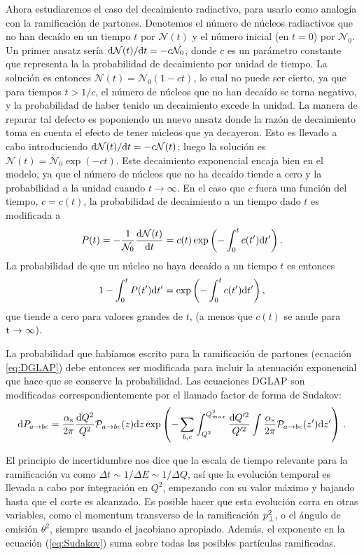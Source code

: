 Ahora estudiaremos el caso del decaimiento radiactivo, para usarlo como analogía con la ramificación de partones. Denotemos el número de núcleos radiactivos que no han decaído en un tiempo $t$ por $\mathcal N(t)$ y el número inicial (en $t=0$) por $\mathcal N_0$. Un primer ansatz sería ${\mathrm d}\mathcal N(t)/{\mathrm d} t = -c \mathcal N_0$, donde $c$ es un parámetro constante que representa la la probabilidad de decaimiento por unidad de tiempo. La solución es entonces $\mathcal N (t) = \mathcal N_0(1-ct)$, lo cual no puede ser cierto, ya que para tiempos $t>1/c$, el número de núcleos que no han decaído se torna negativo, y la probabilidad de haber tenido un decaimiento excede la unidad. La manera de reparar tal defecto es poponiendo un nuevo ansatz donde la razón de decaimiento toma en cuenta el efecto de tener núcleos que ya decayeron. Esto es llevado a cabo introduciendo ${\mathrm d}\mathcal N(t)/{\mathrm d} t = -c \mathcal N(t)$; luego la solución es $\mathcal N(t) = \mathcal N_0 \exp(-ct)$. Este decaimiento exponencial encaja bien en el modelo, ya que el número de núcleos que no ha decaído tiende a cero y la probabilidad a la unidad cuando $t\to \infty$. En el caso que $c$ fuera una función del tiempo, $c=c(t)$, la probabilidad de decaimiento a un tiempo dado $t$ es modificada a
$$P(t)=-\frac{1}{\mathcal N_0} \frac{{\mathrm d}\mathcal N (t)}{{\mathrm d} t} = c(t) \exp\left(-\int_0^t c(t') {\mathrm d} t'\right).$$
La probabilidad de que un núcleo no haya decaído a un tiempo $t$ es entonces
$$1- \int_0^t P(t'){\mathrm d} t' = \exp \left(-\int_0^t c(t'){\mathrm d} t' \right),$$
que tiende a cero para valores grandes de $t$, (a menos que $c(t)$ se anule para ${\mathrm t}\to\infty$).

La probabilidad que habíamos escrito para la ramificación de partones (ecuación \ref{eq:DGLAP}) debe entonces ser modificada para incluir la atenuación exponencial que hace que se conserve la probabilidad. Las ecuaciones DGLAP son modificadas correspondientemente por el llamado factor de forma de Sudakov:
\begin{equation}
  {\mathrm d} P_{a\to bc} = \frac{\alpha_{\mathrm{s}}}{2\pi}\frac{{\mathrm d} Q^2}{Q^2}\mathcal{P}_{a\to bc}(z) {\mathrm d} z \exp \left( -\sum_{b,c}\int^{Q^2_{max}}_{Q^2}\frac{{\mathrm d} Q'^2}{Q'^2} \int \frac{\alpha_{\mathrm{s}}}{2\pi} \mathcal{P}_{a\to bc}(z') {\mathrm d} z' \right)
  \label{eq:Sudakov}
  \, .
\end{equation}

El principio de incertidumbre nos dice que la escala de tiempo relevante para la ramificación va como $\Delta t \sim 1/\Delta E \sim 1/\Delta Q$, así que la evolución temporal es llevada a cabo por integración en $Q^2$, empezando con su valor máximo y bajando hasta que el corte es alcanzado. Es posible hacer que esta evolución corra en otras variables, como el momentum transverso de la ramificación $p_{\perp}^2$, o el ángulo de emisión $\theta^2$, siempre usando el jacobiano apropiado. Además, el exponente en la ecuación (\ref{eq:Sudakov}) suma sobre todas las posibles partículas ramificadas.

